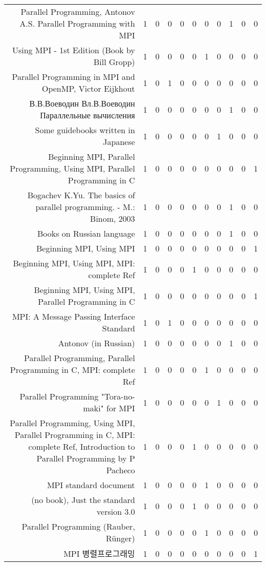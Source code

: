 {\begin{landscape}
\begin{longtable}[htb]{r|c|c|c|c|c|c|c|c|c|c}
{Parallel Programming, Antonov A.S. Parallel Programming with MPI} & 1 & 0 & 0 & 0 & 0 & 0 & 0 & 1 & 0 & 0 \\%
{Using MPI - 1st Edition (Book by Bill Gropp)} & 1 & 0 & 0 & 0 & 0 & 1 & 0 & 0 & 0 & 0 \\%
{Parallel Programming in MPI and OpenMP, Victor Eijkhout} & 1 & 0 & 1 & 0 & 0 & 0 & 0 & 0 & 0 & 0 \\%
{В.В.Воеводин Вл.В.Воеводин Параллельные вычисления} & 1 & 0 & 0 & 0 & 0 & 0 & 0 & 1 & 0 & 0 \\%
{Some guidebooks written in Japanese} & 1 & 0 & 0 & 0 & 0 & 0 & 1 & 0 & 0 & 0 \\%
{Beginning MPI, Parallel Programming, Using MPI, Parallel Programming in C} & 1 & 0 & 0 & 0 & 0 & 0 & 0 & 0 & 0 & 1 \\%
{Bogachev K.Yu. The basics of parallel programming. - M.: Binom, 2003} & 1 & 0 & 0 & 0 & 0 & 0 & 0 & 1 & 0 & 0 \\%
{Books on Russian language} & 1 & 0 & 0 & 0 & 0 & 0 & 0 & 1 & 0 & 0 \\%
{Beginning MPI, Using MPI} & 1 & 0 & 0 & 0 & 0 & 0 & 0 & 0 & 0 & 1 \\%
{Beginning MPI, Using MPI, MPI: complete Ref} & 1 & 0 & 0 & 0 & 1 & 0 & 0 & 0 & 0 & 0 \\%
{Beginning MPI, Using MPI, Parallel Programming in C} & 1 & 0 & 0 & 0 & 0 & 0 & 0 & 0 & 0 & 1 \\%
{MPI: A Message Passing Interface Standard} & 1 & 0 & 1 & 0 & 0 & 0 & 0 & 0 & 0 & 0 \\%
{Antonov (in Russian)} & 1 & 0 & 0 & 0 & 0 & 0 & 0 & 1 & 0 & 0 \\%
{Parallel Programming, Parallel Programming in C, MPI: complete Ref} & 1 & 0 & 0 & 0 & 0 & 1 & 0 & 0 & 0 & 0 \\%
{Parallel Programming "Tora-no-maki" for MPI} & 1 & 0 & 0 & 0 & 0 & 0 & 1 & 0 & 0 & 0 \\%
{Parallel Programming, Using MPI, Parallel Programming in C, MPI: complete Ref, Introduction to Parallel Programming by P Pacheco} & 1 & 0 & 0 & 0 & 1 & 0 & 0 & 0 & 0 & 0 \\%
{MPI standard document} & 1 & 0 & 0 & 0 & 0 & 1 & 0 & 0 & 0 & 0 \\%
{(no book), Just the standard version 3.0} & 1 & 0 & 0 & 0 & 1 & 0 & 0 & 0 & 0 & 0 \\%
{Parallel Programming (Rauber, Rünger)} & 1 & 0 & 0 & 0 & 0 & 1 & 0 & 0 & 0 & 0 \\%
{MPI 병렬프로그래밍} & 1 & 0 & 0 & 0 & 0 & 0 & 0 & 0 & 0 & 1 \\%

\end{longtable}
\end{landscape}}
